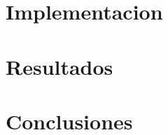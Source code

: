 \documentclass{article} %
\begin{document}
\section{Implementacion}
\section{Resultados}
\section{Conclusiones}
\end{document}
